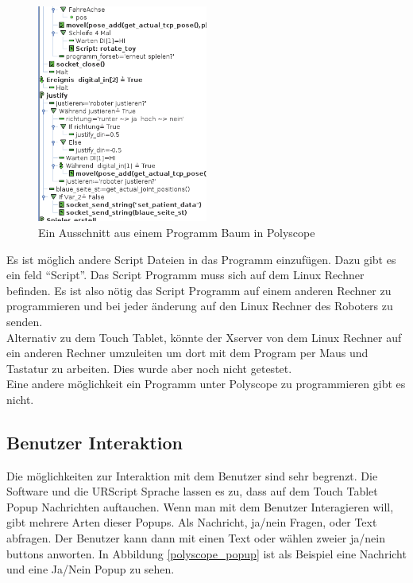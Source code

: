 \begin{figure}[H]
  \centering
    \includegraphics[width=0.5\textwidth]{pic/polyscope_program_tree.png}
      \caption[Programm Baum in Polyscope]{Ein Ausschnitt aus einem Programm Baum in Polyscope}
      \label{fig:programm_in_polyscope}
\end{figure}

Es ist möglich andere Script Dateien in das Programm einzufügen. Dazu gibt es ein feld ``Script''. Das Script Programm muss sich auf dem Linux Rechner befinden. Es ist also nötig das Script Programm auf einem anderen Rechner zu programmieren und bei jeder änderung auf den Linux Rechner des Roboters zu senden.
\\
Alternativ zu dem Touch Tablet, könnte der Xserver von dem Linux Rechner auf ein anderen Rechner umzuleiten um dort mit dem Program per Maus und Tastatur zu arbeiten. Dies wurde aber noch nicht getestet.
\\
Eine andere möglichkeit ein Programm unter Polyscope zu programmieren gibt es nicht.

\subsection{Benutzer Interaktion}
\label{user_interaktion_polyscope_rel}

Die möglichkeiten zur Interaktion mit dem Benutzer sind sehr begrenzt. Die Software und die URScript Sprache lassen es zu, dass auf dem Touch Tablet Popup Nachrichten auftauchen. Wenn man mit dem Benutzer Interagieren will, gibt mehrere Arten dieser Popups.
Als Nachricht, ja/nein Fragen, oder Text abfragen. Der Benutzer kann dann mit einen Text oder wählen zweier ja/nein buttons anworten. In Abbildung \ref{polyscope_popup} 
ist als Beispiel eine Nachricht und eine Ja/Nein Popup zu sehen.

